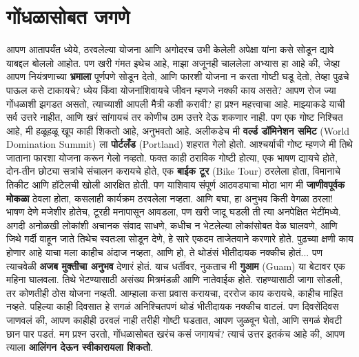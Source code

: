 \chapter{गोंधळासोबत जगणे}
आपण आतापर्यंत ध्येये, ठरवलेल्या योजना आणि अगोदरच उभी केलेली अपेक्षा यांना कसे सोडून द्यावे याबद्दल बोललो आहोत. पण खरी गंमत इथेच आहे, माझा अजूनही चाललेला अभ्यास हा आहे की, जेव्हा आपण नियंत्रणाच्या \textbf{भ्रमाला} पूर्णपणे सोडून देतो, आणि फारशी योजना न करता गोष्टी घडू देतो, तेव्हा पुढचे पाऊल कसे टाकायचे?
ध्येय किंवा योजनांशिवायचे जीवन म्हणजे नक्की काय असते? आपण रोज ज्या गोंधळाशी झगडत असतो, त्याच्याशी आपली मैत्री कशी करावी? हा प्रश्न महत्त्वाचा आहे.
माझ्याकडे याची सर्व उत्तरे नाहीत, आणि खरं सांगायचं तर कोणीच ठाम उत्तरे देऊ शकणार नाही. पण एक गोष्ट निश्चित आहे, मी हळूहळू खूप काही शिकतो आहे, अनुभवतो आहे.
अलीकडेच मी \textbf{वर्ल्ड डॉमिनेशन समिट} (World Domination Summit) ला \textbf{पोर्टलँड} (Portland) शहरात गेलो होतो. आश्चर्याची गोष्ट म्हणजे मी तिथे जाताना फारशा योजना करून गेलो नव्हतो. फक्त काही ठराविक गोष्टी होत्या, एक भाषण द्यायचे होते, दोन-तीन छोट्या सत्रांचे संचालन करायचे होते, एक \textbf{बाईक टूर} (Bike Tour) ठरलेला होता, विमानाचे तिकीट आणि हॉटेलची खोली आरक्षित होती. पण याशिवाय संपूर्ण आठवड्याचा मोठा भाग मी \textbf{जाणीवपूर्वक मोकळा} ठेवला होता, कसलाही कार्यक्रम ठरवलेला नव्हता.
आणि बघा, हा अनुभव किती वेगळा ठरला! भाषण देणे मजेशीर होतेच, टूरही मनापासून आवडला, पण खरी जादू घडली ती त्या अनपेक्षित भेटींमध्ये. अगदी अनोळखी लोकांशी अचानक संवाद साधणे, कधीच न भेटलेल्या लोकांसोबत वेळ घालवणे, आणि जिथे गर्दी वाहून जाते तिथेच स्वतःला सोडून देणे, हे सारे एकदम ताजेतवाने करणारे होते. पुढच्या क्षणी काय होणार आहे याचा मला काहीच अंदाज नव्हता, आणि हो, ते थोडंसं भीतीदायक नक्कीच होतं... पण त्याचवेळी \textbf{अजब मुक्तीचा अनुभव} देणारं होतं.
याच धर्तीवर, नुकताच मी \textbf{गुआम} (Guam) या बेटावर एक महिना घालवला. तिथे भेटण्यासाठी असंख्य मित्रमंडळी आणि नातेवाईक होते. राहण्यासाठी जागा सोडली, तर कोणतीही ठोस योजना नव्हती. आम्हाला कसा प्रवास करायचा, दररोज काय करायचे, काहीच माहित नव्हते. पहिल्या काही दिवसात हे सगळं अनिश्चितपणं थोडं भीतीदायक नक्कीच वाटलं. पण दिवसेंदिवस जाणवलं की, आपण काहीही ठरवलं नाही तरीही गोष्टी घडतात, आपण जुळवून घेतो, आणि सगळं शेवटी छान पार पडतं.
मग प्रश्न उरतो, गोंधळासोबत खरंच कसं जगायचं?
 त्याचं उत्तर इतकंच आहे की, आपण त्याला \textbf{आलिंगन देऊन स्वीकारायला शिकतो}.
